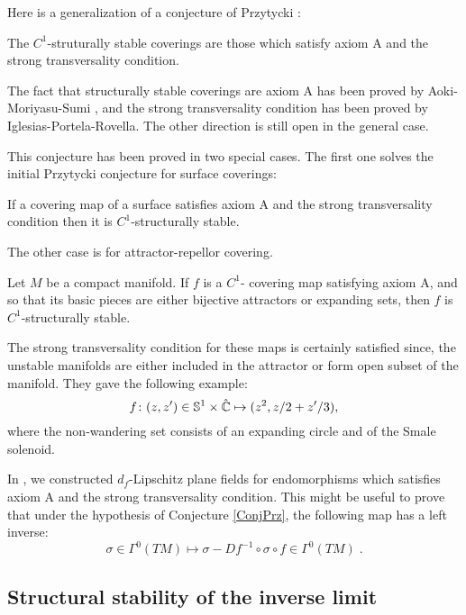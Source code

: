 \documentclass[11pt,openany,leqno]{article}
\begin{document}
Here is a generalization of a conjecture of  Przytycki \cite{Pr77}:

\begin{conj}\label{ConjPrz}
The $C^1$-struturally stable coverings are those which satisfy  axiom A and the strong transversality condition.
\end{conj} 
The fact that structurally stable coverings are axiom A has been proved by Aoki-Moriyasu-Sumi \cite{AMS01}, and the strong transversality condition has been proved by Iglesias-Portela-Rovella. The other direction is still open in the general case.

This conjecture has been proved in two special cases. The first one solves the initial Przytycki conjecture for surface coverings:
\begin{thm} If a covering map of a surface satisfies  axiom A and the strong transversality condition then it is $C^1$-structurally stable. 
\end{thm}
The other case is for attractor-repellor covering. 

\begin{thm} Let $M$
be a compact manifold. If
$f$ is a $C^1$- covering map satisfying  axiom A, and so that its basic pieces are either bijective attractors or expanding sets, then $f$ is $C^1$-structurally stable. \end{thm}
The strong transversality condition for these maps is certainly satisfied since, the unstable manifolds are either included in the attractor or form open subset of the manifold. They gave the following example:
\[f\colon (z,z')\in \mathbb S^1\times \hat {\mathbb C}\mapsto( z^2, z/2+ z'/3),\]
where the non-wandering set consists of an expanding circle and of the Smale solenoid. 

In \cite{BK13}, we constructed $d_f$-Lipschitz plane fields for endomorphisms which satisfies  axiom A and the strong transversality condition. This might be useful to prove that under the hypothesis of Conjecture \ref{ConjPrz}, the following map has a left inverse:
\[\sigma\in \Gamma^0(TM) \mapsto \sigma - Df^{-1}\circ \sigma\circ f \in \Gamma^0(TM)\; .\]



\subsection{Structural stability of the inverse limit}\label{hypimpliesstab3}
\end{document}
